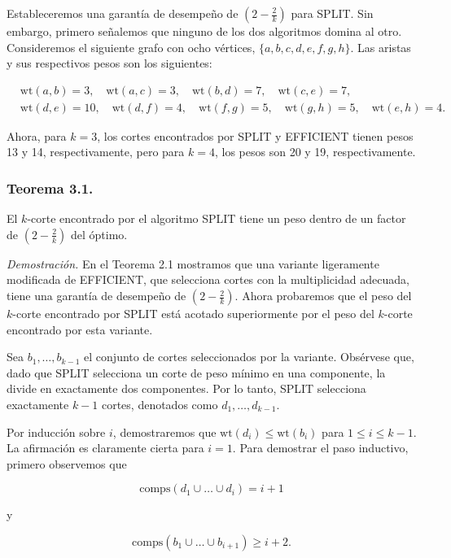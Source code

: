 \documentclass[a4paper, 12pt]{article}
\begin{document}
Estableceremos una garantía de desempeño de \( (2 - \frac{2}{k}) \) para SPLIT. Sin embargo, primero señalemos que ninguno de los dos algoritmos domina al otro. Consideremos el siguiente grafo con ocho vértices, \( \{a, b, c, d, e, f, g, h\} \). Las aristas y sus respectivos pesos son los siguientes:

\[
\begin{aligned}
    &\text{wt}(a, b) = 3, \quad
    \text{wt}(a, c) = 3, \quad
    \text{wt}(b, d) = 7, \quad
    \text{wt}(c, e) = 7, \quad \\
    &\text{wt}(d, e) = 10, \quad
    \text{wt}(d, f) = 4, \quad
    \text{wt}(f, g) = 5, \quad
    \text{wt}(g, h) = 5, \quad
    \text{wt}(e, h) = 4.
\end{aligned}
\]

Ahora, para \( k = 3 \), los cortes encontrados por SPLIT y EFFICIENT tienen pesos 13 y 14, respectivamente, pero para \( k = 4 \), los pesos son 20 y 19, respectivamente.

\subsubsection*{Teorema 3.1.} 
El \( k \)-corte encontrado por el algoritmo SPLIT tiene un peso dentro de un factor de \( (2 - \frac{2}{k}) \) del óptimo.

\textit{Demostración.} En el Teorema 2.1 mostramos que una variante ligeramente modificada de EFFICIENT, que selecciona cortes con la multiplicidad adecuada, tiene una garantía de desempeño de \( (2 - \frac{2}{k}) \). Ahora probaremos que el peso del \( k \)-corte encontrado por SPLIT está acotado superiormente por el peso del \( k \)-corte encontrado por esta variante.

Sea \( b_1, \dots, b_{k-1} \) el conjunto de cortes seleccionados por la variante. Obsérvese que, dado que SPLIT selecciona un corte de peso mínimo en una componente, la divide en exactamente dos componentes. Por lo tanto, SPLIT selecciona exactamente \( k - 1 \) cortes, denotados como \( d_1, \dots, d_{k-1} \).

Por inducción sobre \( i \), demostraremos que \( \text{wt}(d_i) \leq \text{wt}(b_i) \) para \( 1 \leq i \leq k - 1 \). La afirmación es claramente cierta para \( i = 1 \). Para demostrar el paso inductivo, primero observemos que

\[
\text{comps}(d_1 \cup \dots \cup d_i) = i + 1
\]

y

\[
\text{comps}(b_1 \cup \dots \cup b_{i+1}) \geq i + 2.
\]
\end{document}
